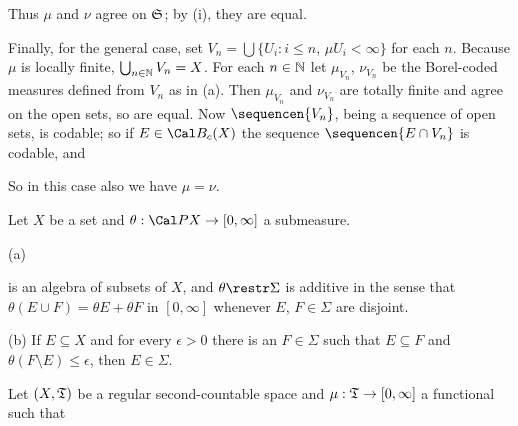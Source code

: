{

\noindent Thus $\mu$ and $\nu$ agree on $\frak S$;  by (i), they are
equal.

\medskip

 Finally, for the general case, set
$V_n=\bigcup\{U_i:i\le n$, $\mu U_i<\infty\}$ for each $n$.   Because $\mu$
is locally finite, $\bigcup_{n\in\Bbb N}V_n=X$.   For each $n\in\Bbb N$ let
$\mu_{V_n}$, $\nu_{V_n}$ be the Borel-coded measures defined from $V_n$ as
in (a).   Then $\mu_{V_n}$ and $\nu_{V_n}$ are totally finite and agree on
the open sets, so are equal.   Now $\sequencen{V_n}$, being a sequence of
open sets, is codable;  so if $E\in\Cal B_c(X)$ the sequence
$\sequencen{E\cap V_n}$ is codable, and


\noindent So in this case also we have $\mu=\nu$.
}%

 Let $X$ be a set and
$\theta:\Cal PX\to[0,\infty]$ a submeasure.

(a)


\noindent is an algebra of subsets of $X$, and $\theta\restr\Sigma$ is
additive in the sense that $\theta(E\cup F)=\theta E+\theta F$ in
$[0,\infty]$ whenever $E$, $F\in\Sigma$ are disjoint.

(b) If $E\subseteq X$ and for
every $\epsilon>0$ there is an $F\in\Sigma$ such that $E\subseteq F$ and
$\theta(F\setminus E)\le\epsilon$, then $E\in\Sigma$.


 Let $(X,\frak T)$
be a regular second-countable space and
$\mu:\frak T\to[0,\infty]$ a functional such that

